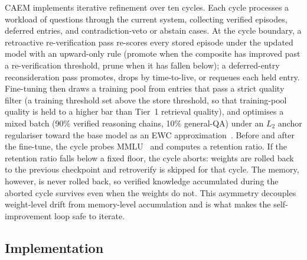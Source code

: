 CAEM implements iterative refinement over ten cycles. Each cycle processes a workload of questions through the current system, collecting verified episodes, deferred entries, and contradiction-veto or abstain cases. At the cycle boundary, a retroactive re-verification pass re-scores every stored episode under the updated model with an upward-only rule (promote when the composite has improved past a re-verification threshold, prune when it has fallen below); a deferred-entry reconsideration pass promotes, drops by time-to-live, or requeues each held entry. Fine-tuning then draws a training pool from entries that pass a strict quality filter (a training threshold set above the store threshold, so that training-pool quality is held to a higher bar than Tier~1 retrieval quality), and optimises a mixed batch (90\% verified reasoning chains, 10\% general-QA) under an $L_2$ anchor regulariser toward the base model as an EWC approximation~\cite{doi:10.1073/pnas.1611835114}. Before and after the fine-tune, the cycle probes MMLU~\cite{hendrycks2021measuring} and computes a retention ratio. If the retention ratio falls below a fixed floor, the cycle aborts: weights are rolled back to the previous checkpoint and retroverify is skipped for that cycle. The memory, however, is never rolled back, so verified knowledge accumulated during the aborted cycle survives even when the weights do not. This asymmetry decouples weight-level drift from memory-level accumulation and is what makes the self-improvement loop safe to iterate.

\subsection{Implementation}

